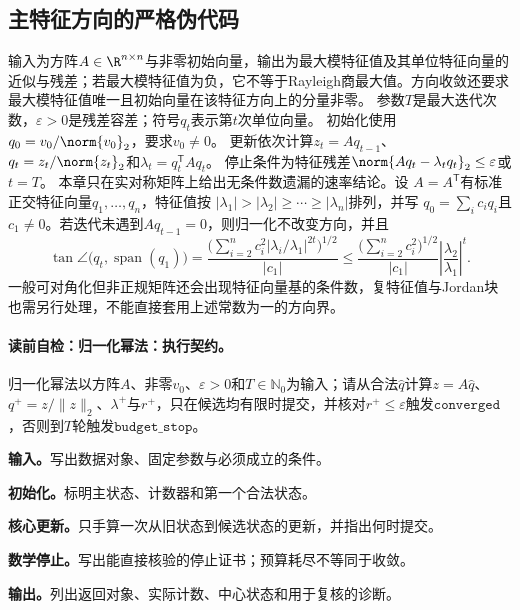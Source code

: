 \subsection*{主特征方向的严格伪代码}
\label{schema:V1-C02:CH-19}
\label{schema:V1-C02:CH-20}
输入为方阵$A\in\R^{n\times n}$与非零初始向量，输出为最大模特征值及其单位特征向量的近似与残差；若最大模特征值为负，它不等于Rayleigh商最大值。方向收敛还要求最大模特征值唯一且初始向量在该特征方向上的分量非零。
\label{schema:V1-C02:CH-21}
参数$T$是最大迭代次数，$\varepsilon>0$是残差容差；符号$q_t$表示第$t$次单位向量。
\label{schema:V1-C02:CH-22}
初始化使用$q_0=v_0/\norm{v_0}_2$，要求$v_0\ne0$。
\label{schema:V1-C02:CH-23}
更新依次计算$z_t=Aq_{t-1}$、$q_t=z_t/\norm{z_t}_2$和$\lambda_t=q_t^{\mathsf T}Aq_t$。
\label{schema:V1-C02:CH-24}
停止条件为特征残差$\norm{Aq_t-\lambda_tq_t}_2\le\varepsilon$或$t=T$。
\label{schema:V1-C02:CH-25}
本章只在实对称矩阵上给出无条件数遗漏的速率结论。设
$A=A^{\mathsf T}$有标准正交特征向量$q_1,\ldots,q_n$，特征值按
$|\lambda_1|>|\lambda_2|\ge\cdots\ge|\lambda_n|$排列，并写
$q_0=\sum_i c_iq_i$且$c_1\ne0$。若迭代未遇到$Aq_{t-1}=0$，则归一化不改变方向，并且
\[
\tan\angle\!\bigl(q_t,\operatorname{span}(q_1)\bigr)
=\frac{\bigl(\sum_{i=2}^n c_i^2|\lambda_i/\lambda_1|^{2t}\bigr)^{1/2}}{|c_1|}
\le \frac{\bigl(\sum_{i=2}^n c_i^2\bigr)^{1/2}}{|c_1|}
\left|\frac{\lambda_2}{\lambda_1}\right|^t.
\]
一般可对角化但非正规矩阵还会出现特征向量基的条件数，复特征值与Jordan块也需另行处理，不能直接套用上述常数为一的方向界。

\paragraph{读前自检：归一化幂法：执行契约。}归一化幂法以方阵$A$、非零$v_0$、$\varepsilon>0$和$T\in\mathbb N_0$为输入；请从合法$\widehat q$计算$z=A\widehat q$、$q^+=z/\lVert z\rVert_2$、$\lambda^+$与$r^+$，只在候选均有限时提交，并核对$r^+\le\varepsilon$触发$\mathtt{converged}$，否则到$T$轮触发$\mathtt{budget\_stop}$。\par
\begin{keypointbox}[title={归一化幂法：五步阅读}]
\textbf{输入。}写出数据对象、固定参数与必须成立的条件。\par
\textbf{初始化。}标明主状态、计数器和第一个合法状态。\par
\textbf{核心更新。}只手算一次从旧状态到候选状态的更新，并指出何时提交。\par
\textbf{数学停止。}写出能直接核验的停止证书；预算耗尽不等同于收敛。\par
\textbf{输出。}列出返回对象、实际计数、中心状态和用于复核的诊断。
\end{keypointbox}

